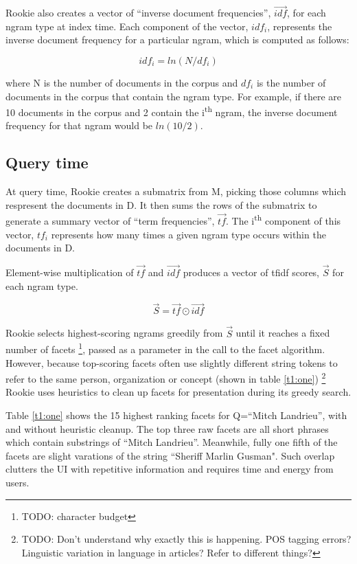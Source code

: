 \documentclass{article}
\begin{document}
Rookie also creates a vector of ``inverse document frequencies'', $\vec{idf}$, for each ngram type at index time. Each component of the vector, $idf_{i}$, represents the inverse document frequency for a particular ngram, which is computed as follows:

\begin{equation}
idf_{i} = ln(N/df_i)
\end{equation}

\noindent where N is the number of documents in the corpus and $df_{i}$ is the number of documents in the corpus that contain the ngram type. For example, if there are 10 documents in the corpus and 2 contain the i\textsuperscript{th} ngram, the inverse document frequency for that ngram would be $ln(10/2)$.

\subsection{Query time}

At query time, Rookie creates a submatrix from M, picking those columns which respresent the documents in D. It then sums the rows of the submatrix to generate a summary vector of ``term frequencies'', $\vec{tf}$. The i\textsuperscript{th} component of this vector, $tf_{i}$ represents how many times a given ngram type occurs within the documents in D. 

Element-wise multiplication of $\vec{tf}$ and $\vec{idf}$ produces a vector of tfidf scores, $\vec{S}$  for each ngram type.

\begin{equation}
\vec{S} = \vec{tf} \odot \vec{idf}
\end{equation}

Rookie selects highest-scoring ngrams greedily from $\vec{S}$ until it reaches a fixed number of facets \footnote{TODO: character budget}, passed as a parameter in the call to the facet algorithm. However, because top-scoring facets often use slightly different string tokens to refer to the same person, organization or concept (shown in table \ref{t1:one}) \footnote{TODO: Don't understand why exactly this is happening. POS tagging errors? Linguistic variation in language in articles? Refer to different things?}
Rookie uses heuristics to clean up facets for presentation during its greedy search.

Table \ref{t1:one} shows the 15 highest ranking facets for Q=``Mitch Landrieu'', with and without heuristic cleanup. The top three raw facets are all short phrases which contain substrings of ``Mitch Landrieu''. Meanwhile, fully one fifth of the facets are slight varations of the string ``Sheriff Marlin Gusman". Such overlap clutters the UI with repetitive information and requires time and energy from users.
\end{document}
